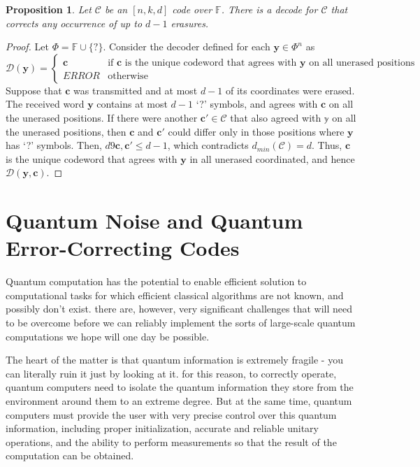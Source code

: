 \documentclass[12pt, oneside]{book}
\newtheorem{proposition}[theorem]{Proposition}
\theoremstyle{definition}
\theoremstyle{definition}
\theoremstyle{remark}
\begin{document}
\begin{proposition}
    Let $\mathcal{C}$ be an $[n,k,d]$ code over $\mathbb{F}$. There is a decode for $\mathcal{C}$ that corrects any occurrence of up to $d-1$ erasures.
\end{proposition}
\begin{proof}
    Let $\Phi=\mathbb{F}\cup \{?\}$. Consider the decoder defined for each $\mathbf{y}\in \Phi^n$ as
    \[
    \mathcal{D}(\mathbf{y})=\begin{cases}
        \mathbf{c} &\text{if $\mathbf{c}$ is the unique codeword that agrees with $\mathbf{y}$ on all unerased positions}\\
        ERROR &\text{otherwise}
    \end{cases}
    \]
    Suppose that $\mathbf{c}$ was transmitted and at most $d-1$ of its coordinates were erased. The received word $\mathbf{y}$ contains at most $d-1$ `?' symbols, and agrees with $\mathbf{c}$ on all the unerased positions. If there were another $\mathbf{c'}\in\mathcal{C}$ that also agreed with $\mathbb{y}$ on all the unerased positions, then $\mathbf{c}$ and $\mathbf{c'}$ could differ only in those positions where $\mathbf{y}$ has `?' symbols. Then, $d9\mathbf{c},\mathbf{c'}\leq d-1$, which contradicts $d_{min}(\mathcal{C})=d$. Thus, $\mathbf{c}$ is the unique codeword that agrees with $\mathbf{y}$ in all unerased coordinated, and hence $\mathcal{D}(\mathbf{y},\mathbf{c})$.
\end{proof}








\chapter{Quantum Noise and Quantum Error-Correcting Codes}


Quantum computation has the potential to enable efficient solution to computational tasks for which efficient classical algorithms are not known, and possibly don't exist. there are, however, very significant challenges that will need to be overcome before we can reliably implement the sorts of large-scale quantum computations we hope will one day be possible.

The heart of the matter is that quantum information is extremely fragile - you can literally ruin it just by looking at it. for this reason, to correctly operate, quantum computers need to isolate the quantum information they store from the environment around them to an extreme degree. But at the same time, quantum computers must provide the user with very precise control over this quantum information, including proper initialization, accurate and reliable unitary operations, and the ability to perform measurements so that the result of the computation can be obtained.
\end{document}
